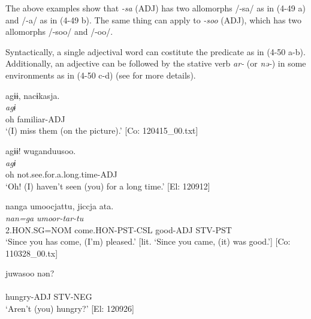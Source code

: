 The above examples show that \textit{{}-sa} (ADJ) has two allomorphs /-sa/ as in (4-49 a) and /-a/ as in (4-49 b). The same thing can apply to \textit{{}-soo} (ADJ), which has two allomorphs /-soo/ and /-oo/.

Syntactically, a single adjectival word can costitute the predicate as in (4-50 a-b). Additionally, an adjective can be followed by the stative verb \textit{ar-} (or \textit{nə-}) in some environments as in (4-50 c-d) (see  for more details).

\ea  \label{ex:4.50}
\ea  \label{ex:4.50a}%
\glll    agɨɨ,  nacɨkasja.\\
      \textit{agɨ}  \textit{}\\
      oh  familiar-ADJ\\
      \glt       ‘(I) miss them (on the picture).’ [Co: 120415\_00.txt]

\ex\label{ex:4.50b}%
\glll    agɨɨ!  wuganduusoo.\\
      \textit{agɨ}  \textit{}\\
      oh  not.see.for.a.long.time-ADJ\\
      \glt       ‘Oh! (I) haven’t seen (you) for a long time.’ [El: 120912]

\ex\label{ex:4.50c}%
\glll    nanga  umoocjattu,  jiccja  ata.\\
      \textit{nan=ga}  \textit{umoor-tar-tu}  \textit{}  \textit{}\\
      2.HON.SG=NOM  come.HON-PST-CSL  good-ADJ  STV-PST\\
      \glt       ‘Since you has come, (I’m) pleased.’ [lit. ‘Since you came, (it) was good.’] [Co: 110328\_00.tx]

\ex\label{ex:4.50d}%
\glll    juwasoo  nən?\\
      \textit{}  \textit{}\\
      hungry-ADJ  STV-NEG\\
      \glt       ‘Aren’t (you) hungry?’ [El: 120926]
    \z
\z

